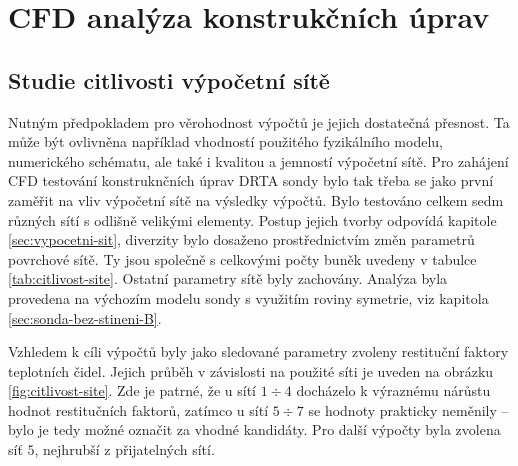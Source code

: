 \section{CFD analýza konstrukčních úprav} \label{sec:konstrukcni-upravy}    
    \subsection{Studie citlivosti výpočetní sítě}
        Nutným předpokladem pro věrohodnost výpočtů je jejich dostatečná přesnost. Ta může být ovlivněna například vhodností použitého fyzikálního modelu, numerického schématu, ale také i kvalitou a jemností výpočetní sítě. Pro zahájení CFD testování konstruknčních úprav DRTA sondy bylo tak třeba se jako první zaměřit na vliv výpočetní sítě na výsledky výpočtů. Bylo testováno celkem sedm různých sítí s odlišně velikými elementy. Postup jejich tvorby odpovídá kapitole \ref{sec:vypocetni-sit}, diverzity bylo dosaženo prostřednictvím změn parametrů povrchové sítě. Ty jsou společně s celkovými počty buněk uvedeny v tabulce \ref{tab:citlivost-site}. Ostatní parametry sítě byly zachovány. Analýza byla provedena na výchozím modelu sondy s využitím roviny symetrie, viz kapitola \ref{sec:sonda-bez-stineni-B}.

        \begin{table}[ht!]
            \centering
            \caption{Parametry síťování pro citlivostní analýzu sítě.}
            \label{tab:citlivost-site}
            \end{table}

        Vzhledem k cíli výpočtů byly jako sledované parametry zvoleny restituční faktory teplotních čidel. Jejich průběh v závislosti na použité síti je uveden na obrázku \ref{fig:citlivost-site}. Zde je patrné, že u sítí $1 \div 4$ docházelo k výraznému nárůstu hodnot restitučních faktorů, zatímco u sítí $5 \div 7$ se hodnoty prakticky neměnily – bylo je tedy možné označit za vhodné kandidáty. Pro další výpočty byla zvolena síť $5$, nejhrubší z přijatelných sítí.

